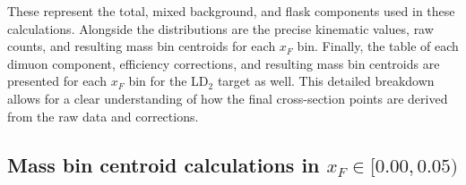 These represent the total, mixed background, and flask components used in these calculations. Alongside the distributions are the precise kinematic values, raw counts, and resulting mass bin centroids for each $x_F$ bin. Finally, the table of each dimuon component, efficiency corrections, and resulting mass bin centroids are presented for each $x_F$ bin for the LD$_2$ target as well. This detailed breakdown allows for a clear understanding of how the final cross-section points are derived from the raw data and corrections.

\clearpage
\subsection{\texorpdfstring{Mass bin centroid calculations in $x_F \in [0.00, 0.05)$}{Mass bin centroid calculations in x\_F in [0.00, 0.05)]}}

